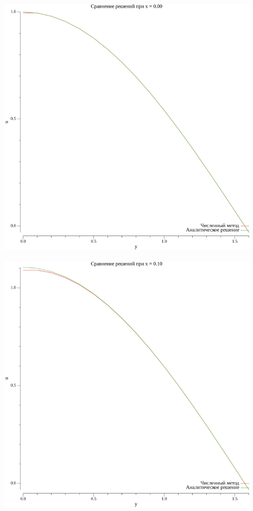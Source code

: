 \documentclass{article}
\begin{document}
\\
\includegraphics[scale=0.6]{2plot_x_0.00.png}
\\

\\
\includegraphics[scale=0.6]{2plot_x_0.10.png}
\\
\end{document}
